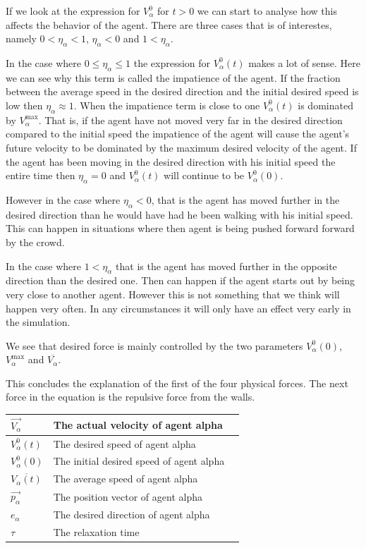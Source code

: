 If we look at the expression for $V_{\alpha}^{0}$ for $t>0$ we can 
start to analyse how this affects the behavior of the agent. There 
are three cases that is of interestes, namely $0 < \eta_{\alpha} < 1$, 
$\eta_{\alpha} < 0$ and $1 < \eta_{\alpha} $.

In the case where $0 \leq \eta_{\alpha} \leq 1$ the expression for 
$V_{\alpha}^{0} \left( t \right)$ makes a lot of sense. Here we can see why this term 
is called the impatience of the agent. If the fraction  between the average 
speed in the desired direction and the initial desired speed is low then 
$\eta_{\alpha} \approx 1$. 
When the impatience term is close to one $V_{\alpha}^{0} \left( t \right)$ is 
dominated by $V_{\alpha}^{\text{max}}$. That is, if the agent have not moved 
very far in the desired direction compared to the initial speed the impatience 
of the agent will cause the agent's future velocity to be dominated by the 
maximum desired velocity of the agent. 
If the agent has been moving in the desired direction with his initial speed 
the entire time then $\eta_{\alpha} = 0$  and $V_{\alpha}^{0} \left( t 
\right)$ will continue to be $V_{\alpha}^{0} \left( 0 \right)$. 

However in the case where $\eta_{\alpha} < 0$, that is the agent has moved 
further in the desired direction than he would have had he been walking with his 
initial speed. This can happen in situations where then agent is being pushed 
forward forward by the crowd.

In the case where $1 < \eta_{\alpha}$ that is the agent has moved further 
in the opposite direction than the desired one. Then can happen if the agent 
starts out by being very close to another agent. However this is not something 
that we think will happen very often. In any circumstances it will only have an 
effect very early in the simulation. 

We see that desired force is mainly controlled by the two parameters $V_{\alpha}^{0} (0)$, 
$V_{\alpha}^{\text{max}}$ and $\overline{V_{\alpha}}$.

This concludes the explanation of the first of the four physical forces. The next 
force in the equation is the repulsive force from the walls.

\begin{center}
\begin{tabular}{lll}
\hline
$\overrightarrow{V_{\alpha}}$ & The actual velocity of agent alpha &\\
\hline
$V_{\alpha}^{0}(t)$ & The desired speed of agent alpha &\\
\hline
$V_{\alpha}^{0}(0)$ & The initial desired speed of agent alpha &\\
\hline
$\overline{V_{\alpha}(t)}$ & The average speed of agent alpha &\\
\hline
$\overrightarrow{p_{\alpha}}$ & The position vector of agent alpha\\
\hline
$e_{\alpha}$& The desired direction of agent alpha\\
\hline
$\tau$& The relaxation time &\\
\hline
\end{tabular}
\end{center}

